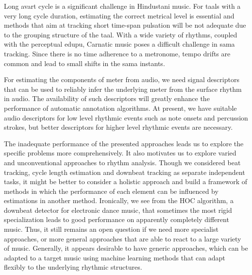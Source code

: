 Long \gls{avart} cycle is a significant challenge in Hindustani music. For \glspl{taal} with a very long cycle duration, estimating the correct metrical level is essential and methods that aim at tracking short time-span pulsation will be not adequate due to the grouping structure of the \gls{taal}. With a wide variety of rhythms, coupled with the perceptual \gls{edupu}, Carnatic music poses a difficult challenge in \gls{sama} tracking. Since there is no time adherence to a metronome, tempo drifts are common and lead to small shifts in the sama instants.  

For estimating the components of meter from audio, we need signal descriptors that can be used to reliably infer the underlying meter from the surface rhythm in audio. The availability of such descriptors will greatly enhance the performance of automatic annotation algorithms. At present, we have suitable audio descriptors for low level rhythmic events such as note onsets and percussion strokes, but better descriptors for higher level rhythmic events are necessary.

The inadequate performance of the presented approaches leads us to explore the specific problems more comprehensively. It also motivates us to explore varied and unconventional approaches to rhythm analysis. Though we considered beat tracking, cycle length estimation and downbeat tracking as separate independent tasks, it might be better to consider a holistic approach and build a framework of methods in which the performance of each element can be influenced by estimations in another method. Ironically, we see from the \acrshort{HOC} algorithm, a downbeat detector for electronic dance music, that sometimes the most rigid specialization leads to good performance on apparently completely different music. Thus, it still remains an open question if we need more specialist approaches, or more general approaches that are able to react to a large variety of music. Generally, it appears desirable to have generic approaches, which can be adapted to a target music using machine learning methods that can adapt flexibly to the underlying rhythmic structures. 